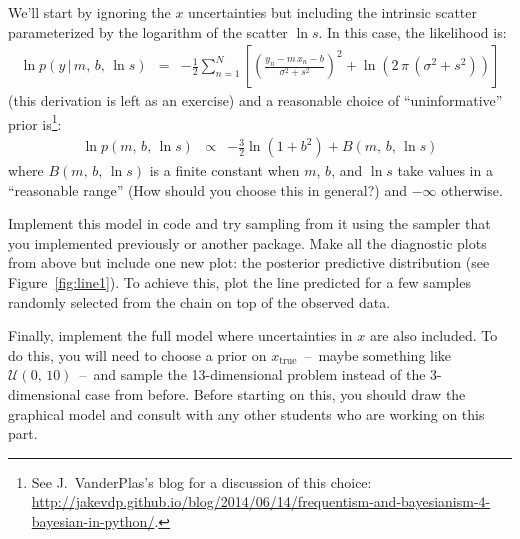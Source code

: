\documentclass[letterpaper,12pt,preprint]{hack_aastex}
\begin{document}
We'll start by ignoring the $x$ uncertainties but including the intrinsic
scatter parameterized by the logarithm of the scatter $\ln s$.
In this case, the likelihood is:
\begin{eqnarray}
\ln p (y\,|\,m,\,b,\,\ln s) &=& -\frac{1}{2} \sum_{n=1}^N\left[
\left(\frac{y_n-m\,x_n-b}{\sigma^2 + s^2}\right)^2 + \ln(2\,\pi\,(\sigma^2 +
s^2))\right]
\end{eqnarray}
(this derivation is left as an exercise)
and a reasonable choice of ``uninformative'' prior is\footnote{See
J.~VanderPlas's blog for a discussion of this choice:
\url{http://jakevdp.github.io/blog/2014/06/14/frequentism-and-bayesianism-4-bayesian-in-python/}.}:
\begin{eqnarray}
\ln p(m,\,b,\,\ln s) &\propto& -\frac{3}{2}\ln(1+b^2) + B(m,\,b,\,\ln s)
\end{eqnarray}
where $B(m,\,b,\,\ln s)$ is a finite constant when $m$, $b$, and $\ln s$ take
values in a ``reasonable range'' (How should you choose this in general?) and
$-\infty$ otherwise.

Implement this model in code and try sampling from it using the sampler that
you implemented previously or another package.
Make all the diagnostic plots from above but include one new plot: the
posterior predictive distribution (see Figure~\ref{fig:line1}).
To achieve this, plot the line predicted for a few samples randomly selected
from the chain on top of the observed data.

Finally, implement the full model where uncertainties in $x$ are also
included.
To do this, you will need to choose a prior on $x_\mathrm{true}$~--~maybe
something like $\mathcal{U}(0,\,10)$~--~and sample the 13-dimensional problem
instead of the 3-dimensional case from before.
Before starting on this, you should draw the graphical model and consult with
any other students who are working on this part.

\newpage


\end{document}
